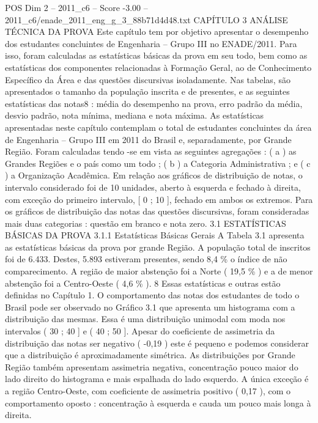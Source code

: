 \begin{textsample}{POS Dim 2 – 2011\_c6 – Score -3.00 – 2011\_c6/enade\_2011\_eng\_g\_3\_88b71d4d48.txt}  \label{ex:f2_pos_412}
CAPÍTULO 3 ANÁLISE TÉCNICA DA PROVA Este capítulo tem por objetivo apresentar o desempenho dos estudantes concluintes de Engenharia – Grupo III no ENADE/2011.
Para isso, foram calculadas as estatísticas básicas da prova em seu todo, bem como as estatísticas dos componentes relacionadas à Formação Geral, ao de Conhecimento Específico da Área e das questões discursivas isoladamente.
Nas tabelas, são apresentados o tamanho da população inscrita e de presentes, e as seguintes estatísticas das notas8 : média do desempenho na prova, erro padrão da média, desvio padrão, nota mínima, mediana e nota máxima.
As estatísticas apresentadas neste capítulo contemplam o total de estudantes concluintes da área de Engenharia – Grupo III em 2011 do Brasil e, separadamente, por Grande Região.
Foram calculadas tendo -se em vista as seguintes agregações : ( a ) as Grandes Regiões e o país como um todo ; ( b ) a Categoria Administrativa ; e ( c ) a Organização Acadêmica.
Em relação aos gráficos de distribuição de notas, o intervalo considerado foi de 10 unidades, aberto à esquerda e fechado à direita, com exceção do primeiro intervalo, [ 0 ; 10 ], fechado em ambos os extremos.
Para os gráficos de distribuição das notas das questões discursivas, foram consideradas mais duas categorias : questão em branco e nota zero. 3.1 ESTATÍSTICAS BÁSICAS DA PROVA 3.1.1 Estatísticas Básicas Gerais A Tabela 3.1 apresenta as estatísticas básicas da prova por grande Região.
A população total de inscritos foi de 6.433.
Destes, 5.893 estiveram presentes, sendo 8,4 \% o índice de não comparecimento.
A região de maior abstenção foi a Norte ( 19,5 \% ) e a de menor abstenção foi a Centro-Oeste ( 4,6 \% ). 8 Essas estatísticas e outras estão definidas no Capítulo 1.
O comportamento das notas dos estudantes de todo o Brasil pode ser observado no Gráfico 3.1 que apresenta um histograma com a distribuição das mesmas.
Essa é uma distribuição unimodal com moda nos intervalos ( 30 ; 40 ] e ( 40 ; 50 ].
Apesar do coeficiente de assimetria da distribuição das notas ser negativo ( -0,19 ) este é pequeno e podemos considerar que a distribuição é aproximadamente simétrica.
As distribuições por Grande Região também apresentam assimetria negativa, concentração pouco maior do lado direito do histograma e mais espalhada do lado esquerdo.
A única exceção é a região Centro-Oeste, com coeficiente de assimetria positivo ( 0,17 ), com o comportamento oposto : concentração à esquerda e cauda um pouco mais longa à direita.

\end{textsample}
